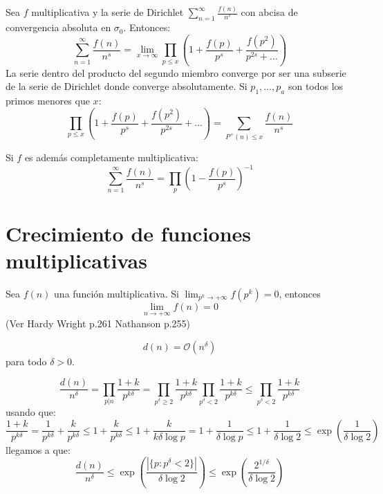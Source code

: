 \documentclass[TAN.tex]{subfiles}
\begin{document}
\begin{prop} Sea $f$ multiplicativa y la serie de Dirichlet $\sum_{n=1}^\infty \frac{f(n)}{n^s}$ con abcisa de convergencia absoluta en $σ_0$. Entonces:
\[ \sum_{n=1}^\infty \frac{f(n)}{n^s} = \lim_{x \to \infty} \prod_{p≤x} \left(1+\frac{f(p)}{p^s} + \frac{f(p^2)}{p^{2s}+\dots}\right) \]
La serie dentro del producto del segundo miembro converge por ser una subserie de la serie de Dirichlet donde converge absolutamente. Si $p_1,\dots,p_a$ son todos los primos menores que $x$:
\[ \prod_{p≤x} \left(1+\frac{f(p)}{p^s} + \frac{f(p^2)}{p^{2s}}+\dots\right) = \sum_{P^+(n)≤x} \frac{f(n)}{n^s} \]
\end{prop}

\begin{coro}

Si $f$ es además completamente multiplicativa:
\[ \sum_{n=1}^\infty \frac{f(n)}{n^s} = \prod_{p}\left(1-\frac{f(p)}{p^s}\right)^{-1}\]
\end{coro}
\section{Crecimiento de funciones multiplicativas}
\begin{teorema}
Sea $f(n)$ una función multiplicativa. Si $\lim_{p^k \to +∞} f(p^k) = 0$, entonces
\[ \lim_{n\to +∞} f(n) = 0 \]
(Ver Hardy Wright p.261 Nathanson p.255)
\end{teorema}
\begin{prop}
\[ d(n) = \mathcal{O}(n^δ) \]
para todo $δ > 0$.
\end{prop}
\begin{dem}
\[ \frac{d(n)}{n^δ} = \prod_{p|n} \frac{1+k}{p^{kδ}} = \prod_{p^δ≥2}\frac{1+k}{p^{kδ}} \prod_{p^δ<2}\frac{1+k}{p^{kδ}} ≤ \prod_{p^δ<2} \frac{1+k}{p^{kδ}}\]
usando que:
\[ \frac{1+k}{p^{kδ}} = \frac{1}{p^{kδ}}+\frac{k}{p^{kδ}} ≤ 1 + \frac{k}{p^{kδ}} ≤ 1 + \frac{k}{kδ\log p} = 1 + \frac{1}{δ\log p} ≤ 1 + \frac{1}{δ\log 2} ≤ \exp\left(\frac{1}{δ\log 2}\right)\]
llegamos a que:
\[ \frac{d(n)}{n^δ} ≤ \exp\left(\frac{|\{p : p^δ<2\}|}{δ\log2}\right) ≤ \exp\left(\frac{2^{1/δ}}{δ\log 2}\right)\]
\end{dem}
\end{document}

